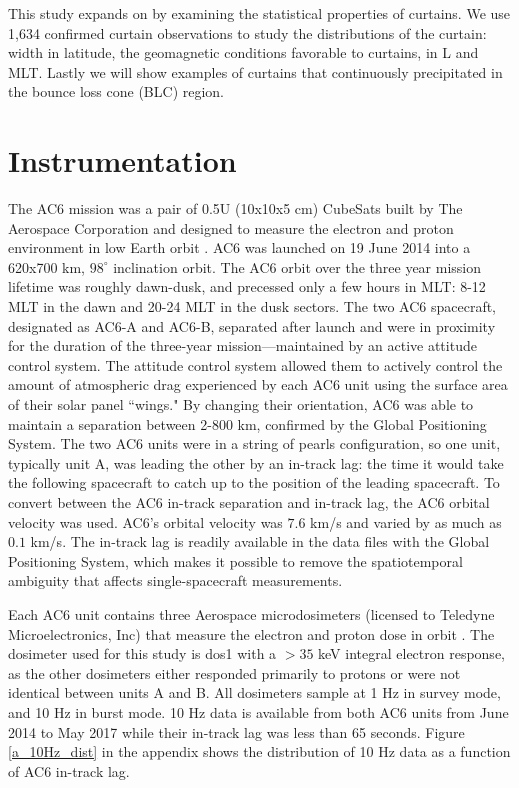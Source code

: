 \documentclass[draft]{agujournal2019}
\begin{document}
This study expands on  by examining the statistical properties of curtains. We use 1,634 confirmed curtain observations to study the distributions of the curtain: width in latitude, the geomagnetic conditions favorable to curtains,  in L and MLT. Lastly we will show examples of curtains that continuously precipitated in the bounce loss cone (BLC) region.

\section{Instrumentation} \label{instrumentation}
The AC6 mission was a pair of 0.5U (10x10x5 cm) CubeSats built by The Aerospace Corporation and designed to measure the electron and proton environment in low Earth orbit \cite{O'Brien2016, O'Brien2019}. AC6 was launched on 19 June 2014 into a 620x700 km, $98^\circ$ inclination orbit. The AC6 orbit over the three year mission lifetime was roughly dawn-dusk, and precessed only a few hours in MLT: 8-12 MLT in the dawn and 20-24 MLT in the dusk sectors. The two AC6 spacecraft, designated as AC6-A and AC6-B, separated after launch and were in proximity for the duration of the three-year mission---maintained by an active attitude control system. The attitude control system allowed them to actively control the amount of atmospheric drag experienced by each AC6 unit using the surface area of their solar panel ``wings." By changing their orientation, AC6 was able to maintain a separation between 2-800 km, confirmed by the Global Positioning System. The two AC6 units were in a string of pearls configuration, so one unit, typically unit A, was leading the other by an in-track lag: the time it would take the following spacecraft to catch up to the position of the leading spacecraft. To convert between the AC6 in-track separation and in-track lag, the AC6 orbital velocity was used. AC6's orbital velocity was $7.6$ km/s and varied by as much as $0.1$ km/s. The in-track lag is readily available in the data files with the Global Positioning System, which makes it possible to remove the spatiotemporal ambiguity that affects single-spacecraft measurements.

Each AC6 unit contains three Aerospace microdosimeters (licensed to Teledyne Microelectronics, Inc) that measure the electron and proton dose in orbit \cite{O'Brien2016}. The dosimeter used for this study is dos1 with a $> 35$ keV integral electron response, as the other dosimeters either responded primarily to protons or were not identical between units A and B. All dosimeters sample at 1 Hz in survey mode, and 10 Hz in burst mode. 10 Hz data is available from both AC6 units from June 2014 to May 2017 while their in-track lag was less than 65 seconds. Figure \ref{a_10Hz_dist} in the appendix shows the distribution of 10 Hz data as a function of AC6 in-track lag.
\end{document}
